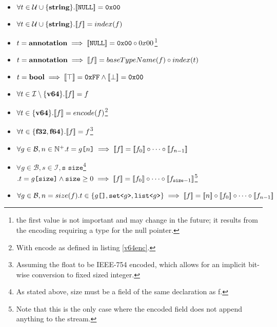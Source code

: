 \begin{itemize}
 \item $\forall t \in \mathcal{U}\cup\{\textbf{string}\}. [\![\texttt{NULL}]\!] = \texttt{0x00}$
 \item $\forall t \in \mathcal{U}\cup\{\textbf{string}\}. [\![f]\!] = index(f)$
 
 \item $t=\textbf{annotation} \implies [\![\texttt{NULL}]\!] = \texttt{0x00} \circ 0x00$\footnote{the first value is not important and may change in the future; it results from the encoding requiring a type for the null pointer.}
 \item $t=\textbf{annotation} \implies [\![f]\!] = baseTypeName(f) \circ index(t)$ 
 
 \item $t=\textbf{bool} \implies [\![\top]\!] = \texttt{0xFF} \wedge [\![\bot]\!] = \texttt{0x00}$
 
 \item $\forall t \in \mathcal{I}\setminus\{\textbf{v64}\}. [\![f]\!] = f$
 
 \item $\forall t \in \{\textbf{v64}\}. [\![f]\!] = encode(f)$\footnote{With encode as defined in listing \ref{v64enc}.}
 
 \item $\forall t \in \{\textbf{f32},\textbf{f64}\}. [\![f]\!] = f$\footnote{Assuming the float to be IEEE-754 encoded, which allows for an implicit bit-wise conversion to fixed sized integer.}
 
 \item $\forall g \in \mathcal{B}, n \in \mathbb{N}^+. t = g\texttt{[}n\texttt{]} \implies [\![f]\!] = [\![f_0]\!] \circ \cdots \circ [\![f_{n-1}]\!]$
 
 \item $\forall g \in \mathcal{B}, s \in \mathcal{I}, \texttt{s size}$\footnote{As stated above, size must be a field of the same declaration as f.} $. t = g\texttt{[size]} \wedge \texttt{size} \geq 0 \implies [\![f]\!] = [\![f_0]\!] \circ \cdots \circ [\![f_{\texttt{size}-1}]\!]$\footnote{Note that this is the only case where the encoded field does not append anything to the stream.}
 
 \item $\forall g \in \mathcal{B}, n = size(f). t \in \{g\texttt{[]}, \texttt{set<}g\texttt{>}, \texttt{list<}g\texttt{>}\} \implies \den{f} = \den{n} \circ \den{f_0} \circ \cdots \circ \den{f_{n-1}}$
 

\end{itemize}
